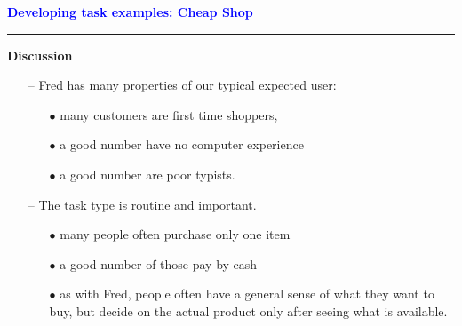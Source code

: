 \documentclass[pdf]{beamer}
\begin{document}
{%
\begin{frame}
	\vspace{8mm}
	\textcolor{Blue}{\textbf{\Large{Developing task examples: Cheap Shop}}}
    \textcolor{red}{\rule{10cm}{1mm}}


    \bigskip
    \textbf{Discussion}
    \bigskip
    \begin{itemize}
    	\item[{--}] Fred has many properties of our typical expected user:
        \begin{itemize}
        	\item[{$\bullet$}] many customers are first time shoppers,
            \item[{$\bullet$}] a good number have no computer experience
            \item[{$\bullet$}] a good number are poor typists.
        \end{itemize}
        \item[{--}] The task type is routine and important. 
        \begin{itemize}
        	\item[{$\bullet$}] many people often purchase only one item
            \item[{$\bullet$}] a good number of those pay by cash
            \item[{$\bullet$}] as with Fred, people often have a general sense of what they want to buy, but decide on the actual product only after seeing what is available.
        \end{itemize}
	\end{itemize}
\end{frame}}
\end{document}
